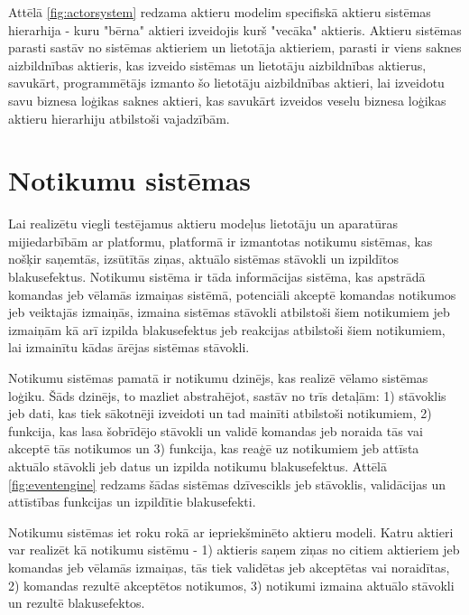 Attēlā \ref{fig:actorsystem} redzama aktieru modelim specifiskā aktieru sistēmas
hierarhija - kuru "bērna" aktieri izveidojis kurš "vecāka" aktieris. Aktieru
sistēmas parasti sastāv no sistēmas aktieriem un lietotāja aktieriem, parasti ir
viens saknes aizbildnības aktieris, kas izveido sistēmas un lietotāju
aizbildnības aktierus, savukārt, programmētājs izmanto šo lietotāju aizbildnības
aktieri, lai izveidotu savu biznesa loģikas saknes aktieri, kas savukārt
izveidos veselu biznesa loģikas aktieru hierarhiju atbilstoši vajadzībām.
\cite[para. The Akka actor hierarchy]{LightbendAkka2619}

\section{Notikumu sistēmas}
\label{sec:eventsourcing}

Lai realizētu viegli testējamus aktieru modeļus lietotāju un aparatūras
mijiedarbībām ar platformu, platformā ir izmantotas notikumu sistēmas, kas
nošķir saņemtās, izsūtītās ziņas, aktuālo sistēmas stāvokli un izpildītos
blakusefektus. Notikumu sistēma ir tāda informācijas sistēma, kas apstrādā
komandas jeb vēlamās izmaiņas sistēmā, potenciāli akceptē komandas notikumos jeb
veiktajās izmaiņās, izmaina sistēmas stāvokli atbilstoši šiem notikumiem jeb
izmaiņām kā arī izpilda blakusefektus jeb reakcijas atbilstoši šiem notikumiem,
lai izmainītu kādas ārējas sistēmas stāvokli.
\cite[para. 3.2.3]{JohnsenEspen2018}

Notikumu sistēmas pamatā ir notikumu dzinējs, kas realizē vēlamo sistēmas
loģiku. Šāds dzinējs, to mazliet abstrahējot, sastāv no trīs detaļām: 1)
stāvoklis jeb dati, kas tiek sākotnēji izveidoti un tad mainīti atbilstoši
notikumiem, 2) funkcija, kas lasa šobrīdējo stāvokli un validē komandas jeb
noraida tās vai akceptē tās notikumos un 3) funkcija, kas reaģē uz notikumiem
jeb attīsta aktuālo stāvokli jeb datus un izpilda notikumu blakusefektus. Attēlā
\ref{fig:eventengine} redzams šādas sistēmas dzīvescikls jeb stāvoklis,
validācijas un attīstības funkcijas un izpildītie blakusefekti.

Notikumu sistēmas iet roku rokā ar iepriekšminēto aktieru modeli. Katru aktieri
var realizēt kā notikumu sistēmu - 1) aktieris saņem ziņas no citiem aktieriem
jeb komandas jeb vēlamās izmaiņas, tās tiek validētas jeb akceptētas vai
noraidītas, 2) komandas rezultē akceptētos notikumos, 3) notikumi izmaina
aktuālo stāvokli un rezultē blakusefektos. 

